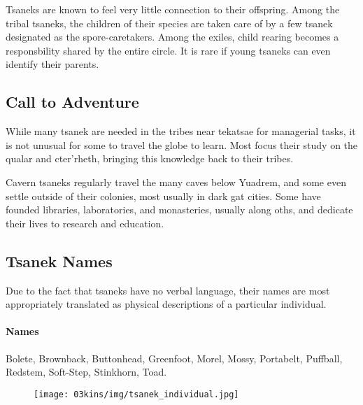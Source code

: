 \begin{linenumbers}
Tsaneks are known to feel very little connection to their offspring.
Among the tribal tsaneks, the children of their species are taken care of by a few tsanek designated as the spore-caretakers.
Among the exiles, child rearing becomes a responsbility shared by the entire circle.
It is rare if young tsaneks can even identify their parents.

\subsection*{Call to Adventure}
While many tsanek are needed in the tribes near tekatsae for managerial tasks, it is not unusual for some to travel the globe to learn.
Most focus their study on the qualar and cter'rheth, bringing this knowledge back to their tribes.

Cavern tsaneks regularly travel the many caves below Yuadrem, and some even settle outside of their colonies, most usually in dark gat cities.
Some have founded libraries, laboratories, and monasteries, usually along oths, and dedicate their lives to research and education.

\subsection*{Tsanek Names}
Due to the fact that tsaneks have no verbal language, their names are most appropriately translated as physical descriptions of a particular individual.

\paragraph{Names} Bolete, Brownback, Buttonhead, Greenfoot, Morel, Mossy, Portabelt, Puffball, Redstem, Soft-Step, Stinkhorn, Toad.

\begin{figure}[!t]
    \centering
    \texttt{[image: 03kins/img/tsanek\_individual.jpg]}
\end{figure}


\end{linenumbers}
